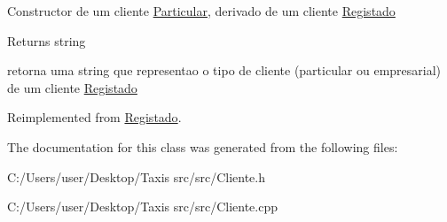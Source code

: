 Constructor de um cliente \hyperlink{class_particular}{Particular}, derivado de um cliente \hyperlink{class_registado}{Registado}

\begin{DoxyReturn}{Returns}
string
\end{DoxyReturn}
retorna uma string que representao o tipo de cliente (particular ou empresarial) de um cliente \hyperlink{class_registado}{Registado} 

Reimplemented from \hyperlink{class_registado}{Registado}.



The documentation for this class was generated from the following files\+:\begin{DoxyCompactItemize}
\item 
C\+:/\+Users/user/\+Desktop/\+Taxis src/src/Cliente.\+h\item 
C\+:/\+Users/user/\+Desktop/\+Taxis src/src/Cliente.\+cpp\end{DoxyCompactItemize}
